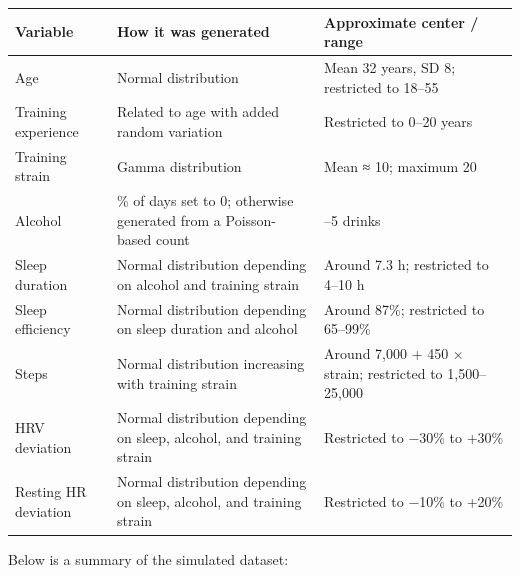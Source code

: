 \documentclass[
  letterpaper,
  DIV=11,
  numbers=noendperiod]{scrreprt}
\newcounter{none} %
\begin{document}
{\def\LTcaptype{none} %
\begin{longtable}[]{@{}
  >{\raggedright\arraybackslash}p{}
  >{\raggedright\arraybackslash}p{}
  >{\raggedright\arraybackslash}p{}@{}}
\toprule\noalign{}
\begin{minipage}[b]{\linewidth}\raggedright
Variable
\end{minipage} & \begin{minipage}[b]{\linewidth}\raggedright
How it was generated
\end{minipage} & \begin{minipage}[b]{\linewidth}\raggedright
Approximate center / range
\end{minipage} \\
\midrule\noalign{}
\endhead
\bottomrule\noalign{}
\endlastfoot
Age & Normal distribution & Mean 32 years, SD 8; restricted to 18--55 \\
Training experience & Related to age with added random variation &
Restricted to 0--20 years \\
Training strain & Gamma distribution & Mean ≈ 10; maximum 20 \\
Alcohol & 72\% of days set to 0; otherwise generated from a
Poisson-based count & 0--5 drinks \\
Sleep duration & Normal distribution depending on alcohol and training
strain & Around 7.3 h; restricted to 4--10 h \\
Sleep efficiency & Normal distribution depending on sleep duration and
alcohol & Around 87\%; restricted to 65--99\% \\
Steps & Normal distribution increasing with training strain & Around
7,000 + 450 × strain; restricted to 1,500--25,000 \\
HRV deviation & Normal distribution depending on sleep, alcohol, and
training strain & Restricted to −30\% to +30\% \\
Resting HR deviation & Normal distribution depending on sleep, alcohol,
and training strain & Restricted to −10\% to +20\% \\
\end{longtable}
}

Below is a summary of the simulated dataset:
\end{document}
